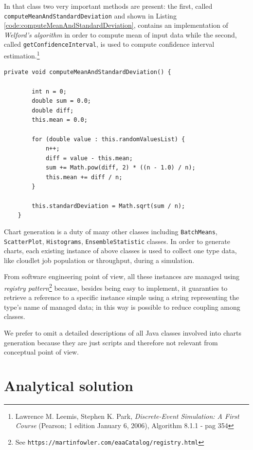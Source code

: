 \documentclass[10pt,a4paper]{article}
\begin{document}
In that class two very important methods are present: the first, called \texttt{computeMeanAnd\-Stan\-dard\-Deviation} and shown in Listing \ref{code:computeMeanAndStandardDeviation}, contains an implementation of \textit{Welford’s algorithm} in order to compute mean of input data while the second, called \texttt{getConfidenceInterval}, is used to compute confidence interval estimation.\footnote{Lawrence M. Leemis, Stephen K. Park, \textit{Discrete-Event Simulation: A First Course} (Pearson; 1 edition January 6, 2006), Algorithm 8.1.1 - pag 354}

\begin{lstlisting}[frame=lines, caption={\texttt{computeMeanAndStandardDeviation} method implementation},label={code:computeMeanAndStandardDeviation}]
private void computeMeanAndStandardDeviation() {

        int n = 0;
        double sum = 0.0;
        double diff;
        this.mean = 0.0;

        for (double value : this.randomValuesList) {
            n++;
            diff = value - this.mean;
            sum += Math.pow(diff, 2) * ((n - 1.0) / n);
            this.mean += diff / n;
        }

        this.standardDeviation = Math.sqrt(sum / n);
    }
\end{lstlisting}

Chart generation is a duty of many other classes including \texttt{BatchMeans}, \texttt{ScatterPlot}, \texttt{Histograms}, \texttt{EnsembleStatistic} classes. 
In order to generate charts, each existing instance of above classes is used to collect one type data, like cloudlet job population or throughput, during a simulation.

From software engineering point of view, all these instances are managed using \textit{registry pattern}\footnote{See \texttt{https://martinfowler.com/eaaCatalog/registry.html}} because, besides being easy to implement, it guaranties to retrieve a reference to a specific instance simple using a string representing the type's name of managed data; in this way is possible to reduce coupling among classes. 

We prefer to omit a detailed descriptions of all Java classes involved into charts generation because they are just scripts and therefore not relevant from conceptual point of view. 

\newpage
\section{Analytical solution}
\end{document}
